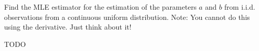 
Find the MLE estimator for the estimation of the parameters $a$ and $b$
from i.i.d. observations from a continuous uniform distribution. Note:
You cannot do this using the derivative. Just think about it!


TODO
